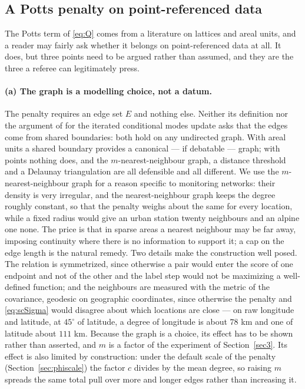\subsection{A Potts penalty on point-referenced data}\label{sec2:potts}

The Potts term of \eqref{eq:Q} comes from a literature on lattices and areal units, and a reader may fairly ask whether it belongs on point-referenced data at all. It does, but three points need to be argued rather than assumed, and they are the three a referee can legitimately press.

\paragraph{(a) The graph is a modelling choice, not a datum.} The penalty requires an edge set $E$ and nothing else. Neither its definition nor the argument of \citet{Besag1986} for the iterated conditional modes update asks that the edges come from shared boundaries: both hold on any undirected graph. With areal units a shared boundary provides a canonical --- if debatable --- graph; with points nothing does, and the $m$-nearest-neighbour graph, a distance threshold and a Delaunay triangulation are all defensible and all different. We use the $m$-nearest-neighbour graph for a reason specific to monitoring networks: their density is very irregular, and the nearest-neighbour graph keeps the degree roughly constant, so that the penalty weighs about the same for every location, while a fixed radius would give an urban station twenty neighbours and an alpine one none. The price is that in sparse areas a nearest neighbour may be far away, imposing continuity where there is no information to support it; a cap on the edge length is the natural remedy. Two details make the construction well posed. The relation is symmetrized, since otherwise a pair would enter the score of one endpoint and not of the other and the label step would not be maximizing a well-defined function; and the neighbours are measured with the metric of the covariance, geodesic on geographic coordinates, since otherwise the penalty and \eqref{eq:scSigma} would disagree about which locations are close --- on raw longitude and latitude, at $45^\circ$ of latitude, a degree of longitude is about $78$ km and one of latitude about $111$ km. Because the graph is a choice, its effect has to be shown rather than asserted, and $m$ is a factor of the experiment of Section~\ref{sec3}. Its effect is also limited by construction: under the default scale of the penalty (Section~\ref{sec:phiscale}) the factor $c$ divides by the mean degree, so raising $m$ spreads the same total pull over more and longer edges rather than increasing it.

